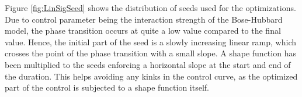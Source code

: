 Figure \ref{fig:LinSigSeed} shows the distribution of seeds used for the optimizations. Due to control parameter being the interaction strength of the Bose-Hubbard model, the phase transition occurs at quite a low value compared to the final value. Hence, the initial part of the seed is a slowly increasing linear ramp, which crosses the point of the phase transition with a small slope. A shape function has been multiplied to the seeds enforcing a horizontal slope at the start and end of the duration. This helps avoiding any kinks in the control curve, as the optimized part of the control is subjected to a shape function itself.